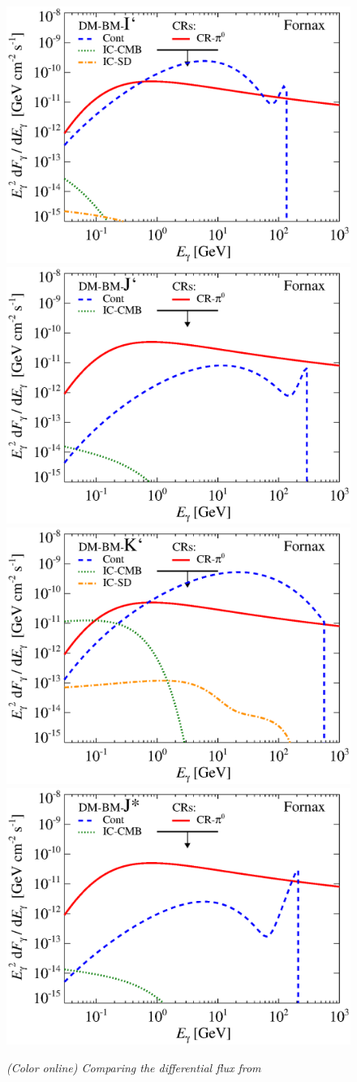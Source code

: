 \documentclass[10pt,aps,pra,reprint,amsmath,amsfonts,amssymb,showpacs,nofootinbib,floatfix]{revtex4-1}
\begin{document}
\begin{figure}
\begin{minipage}{2.0\columnwidth}
 \includegraphics[width=0.49\columnwidth]{figures/flux.BMcompI.v14.0.1deg.1.6T.SubMass.IR2.noMW.woGal.eps}
\includegraphics[width=0.49\columnwidth]{figures/flux.BMcompJ.v14.0.1deg.1.6T.SubMass.IR2.noMW.woGal.eps}
\includegraphics[width=0.49\columnwidth]{figures/flux.BMcompK.v14.0.1deg.1.6T.SubMass.IR2.noMW.woGal.eps}
\includegraphics[width=0.49\columnwidth]{figures/flux.BMcompJs.v14.0.1deg.1.6T.SubMass.IR2.noMW.woGal.eps}
\caption{\it (Color online) Comparing the differential flux from
}
\end{minipage}
\end{figure}
\end{document}
